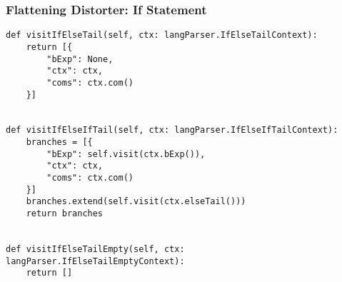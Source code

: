 \documentclass{beamer}
\begin{document}
\begin{frame}[fragile]
    \frametitle{Flattening Distorter: If Statement}
    \scriptsize
    \begin{verbatim}
def visitIfElseTail(self, ctx: langParser.IfElseTailContext):
    return [{
        "bExp": None,
        "ctx": ctx,
        "coms": ctx.com()
    }]


def visitIfElseIfTail(self, ctx: langParser.IfElseIfTailContext):
    branches = [{
        "bExp": self.visit(ctx.bExp()),
        "ctx": ctx,
        "coms": ctx.com()
    }]
    branches.extend(self.visit(ctx.elseTail()))
    return branches


def visitIfElseTailEmpty(self, ctx: langParser.IfElseTailEmptyContext):
    return []
    \end{verbatim}
\end{frame}
\end{document}
